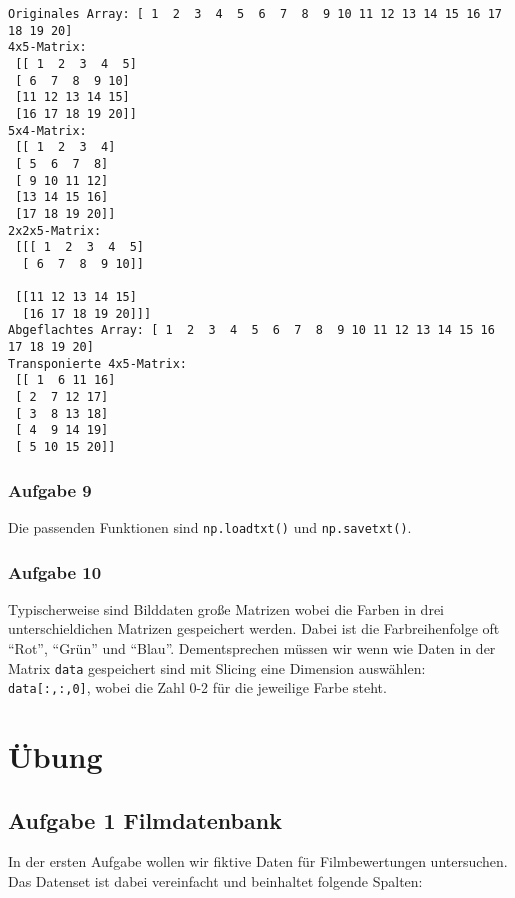 \documentclass[
  letterpaper,
  DIV=11,
  numbers=noendperiod]{scrreprt}
\begin{document}
\begin{tcolorbox}
\begin{tcolorbox}
\begin{verbatim}
Originales Array: [ 1  2  3  4  5  6  7  8  9 10 11 12 13 14 15 16 17 18 19 20]
4x5-Matrix:
 [[ 1  2  3  4  5]
 [ 6  7  8  9 10]
 [11 12 13 14 15]
 [16 17 18 19 20]]
5x4-Matrix:
 [[ 1  2  3  4]
 [ 5  6  7  8]
 [ 9 10 11 12]
 [13 14 15 16]
 [17 18 19 20]]
2x2x5-Matrix:
 [[[ 1  2  3  4  5]
  [ 6  7  8  9 10]]

 [[11 12 13 14 15]
  [16 17 18 19 20]]]
Abgeflachtes Array: [ 1  2  3  4  5  6  7  8  9 10 11 12 13 14 15 16 17 18 19 20]
Transponierte 4x5-Matrix:
 [[ 1  6 11 16]
 [ 2  7 12 17]
 [ 3  8 13 18]
 [ 4  9 14 19]
 [ 5 10 15 20]]
\end{verbatim}

\subsection*{Aufgabe 9}\label{aufgabe-9-1}

Die passenden Funktionen sind \texttt{np.loadtxt()} und
\texttt{np.savetxt()}.

\subsection*{Aufgabe 10}\label{aufgabe-10-1}

Typischerweise sind Bilddaten große Matrizen wobei die Farben in drei
unterschieldichen Matrizen gespeichert werden. Dabei ist die
Farbreihenfolge oft ``Rot'', ``Grün'' und ``Blau''. Dementsprechen
müssen wir wenn wie Daten in der Matrix \texttt{data} gespeichert sind
mit Slicing eine Dimension auswählen: \texttt{data{[}:,:,0{]}}, wobei
die Zahl 0-2 für die jeweilige Farbe steht.

\end{tcolorbox}

\chapter{Übung}\label{uxfcbung}

\section{Aufgabe 1 Filmdatenbank}\label{aufgabe-1-filmdatenbank}

In der ersten Aufgabe wollen wir fiktive Daten für Filmbewertungen
untersuchen. Das Datenset ist dabei vereinfacht und beinhaltet folgende
Spalten:


\end{tcolorbox}
\end{document}
